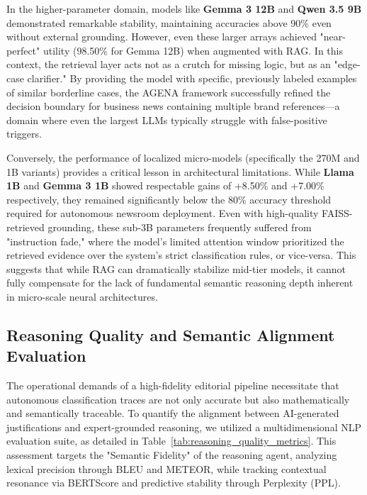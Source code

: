 \documentclass{ieeeaccess}
\begin{document}
In the higher-parameter domain, models like \textbf{Gemma 3 12B} and \textbf{Qwen 3.5 9B} demonstrated remarkable stability, maintaining accuracies above 90\% even without external grounding. However, even these larger arrays achieved "near-perfect" utility (98.50\% for Gemma 12B) when augmented with RAG. In this context, the retrieval layer acts not as a crutch for missing logic, but as an "edge-case clarifier." By providing the model with specific, previously labeled examples of similar borderline cases, the AGENA framework successfully refined the decision boundary for business news containing multiple brand references—a domain where even the largest LLMs typically struggle with false-positive triggers.

Conversely, the performance of localized micro-models (specifically the 270M and 1B variants) provides a critical lesson in architectural limitations. While \textbf{Llama 1B} and \textbf{Gemma 3 1B} showed respectable gains of +8.50\% and +7.00\% respectively, they remained significantly below the 80\% accuracy threshold required for autonomous newsroom deployment. Even with high-quality FAISS-retrieved grounding, these sub-3B parameters frequently suffered from "instruction fade," where the model's limited attention window prioritized the retrieved evidence over the system's strict classification rules, or vice-versa. This suggests that while RAG can dramatically stabilize mid-tier models, it cannot fully compensate for the lack of fundamental semantic reasoning depth inherent in micro-scale neural architectures.

\subsection{Reasoning Quality and Semantic Alignment Evaluation}
The operational demands of a high-fidelity editorial pipeline necessitate that autonomous classification traces are not only accurate but also mathematically and semantically traceable. To quantify the alignment between AI-generated justifications and expert-grounded reasoning, we utilized a multidimensional NLP evaluation suite, as detailed in Table~\ref{tab:reasoning_quality_metrics}. This assessment targets the "Semantic Fidelity" of the reasoning agent, analyzing lexical precision through BLEU and METEOR, while tracking contextual resonance via BERTScore and predictive stability through Perplexity (PPL).
\end{document}
